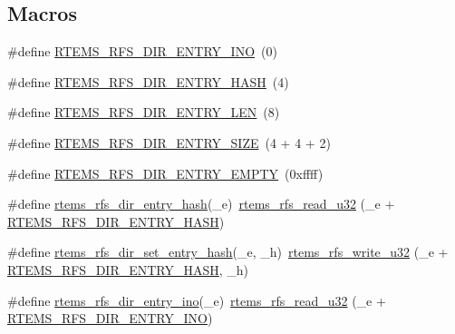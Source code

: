 \subsection*{Macros}
\begin{DoxyCompactItemize}
\item 
\#define \mbox{\hyperlink{rtems-rfs-dir_8h_a0b52d37896f9be61b9946bc726aecd4d}{R\+T\+E\+M\+S\+\_\+\+R\+F\+S\+\_\+\+D\+I\+R\+\_\+\+E\+N\+T\+R\+Y\+\_\+\+I\+NO}}~(0)
\item 
\#define \mbox{\hyperlink{rtems-rfs-dir_8h_a63fb1e0d701229800ef9f1206d8ac295}{R\+T\+E\+M\+S\+\_\+\+R\+F\+S\+\_\+\+D\+I\+R\+\_\+\+E\+N\+T\+R\+Y\+\_\+\+H\+A\+SH}}~(4)
\item 
\#define \mbox{\hyperlink{rtems-rfs-dir_8h_ab32ed76f1463d9de333a986fd2290f8f}{R\+T\+E\+M\+S\+\_\+\+R\+F\+S\+\_\+\+D\+I\+R\+\_\+\+E\+N\+T\+R\+Y\+\_\+\+L\+EN}}~(8)
\item 
\#define \mbox{\hyperlink{rtems-rfs-dir_8h_a57764521961897da4d101db20a52b054}{R\+T\+E\+M\+S\+\_\+\+R\+F\+S\+\_\+\+D\+I\+R\+\_\+\+E\+N\+T\+R\+Y\+\_\+\+S\+I\+ZE}}~(4 + 4 + 2)
\item 
\#define \mbox{\hyperlink{rtems-rfs-dir_8h_aa915855cc4cb98df4b2066beaa13030c}{R\+T\+E\+M\+S\+\_\+\+R\+F\+S\+\_\+\+D\+I\+R\+\_\+\+E\+N\+T\+R\+Y\+\_\+\+E\+M\+P\+TY}}~(0xffff)
\item 
\#define \mbox{\hyperlink{rtems-rfs-dir_8h_af5bfaf8b9997cd44ca60fd1e2347c73b}{rtems\+\_\+rfs\+\_\+dir\+\_\+entry\+\_\+hash}}(\+\_\+e)~\mbox{\hyperlink{rtems-rfs-data_8h_ae061f1784ebeef490293e0080740041a}{rtems\+\_\+rfs\+\_\+read\+\_\+u32}} (\+\_\+e + \mbox{\hyperlink{rtems-rfs-dir_8h_a63fb1e0d701229800ef9f1206d8ac295}{R\+T\+E\+M\+S\+\_\+\+R\+F\+S\+\_\+\+D\+I\+R\+\_\+\+E\+N\+T\+R\+Y\+\_\+\+H\+A\+SH}})
\item 
\#define \mbox{\hyperlink{rtems-rfs-dir_8h_a654eb125381a6880f1f2c681c762888c}{rtems\+\_\+rfs\+\_\+dir\+\_\+set\+\_\+entry\+\_\+hash}}(\+\_\+e,  \+\_\+h)~\mbox{\hyperlink{rtems-rfs-data_8h_a0e7b57b15dac03868caaeb7d2c8c1ba7}{rtems\+\_\+rfs\+\_\+write\+\_\+u32}} (\+\_\+e + \mbox{\hyperlink{rtems-rfs-dir_8h_a63fb1e0d701229800ef9f1206d8ac295}{R\+T\+E\+M\+S\+\_\+\+R\+F\+S\+\_\+\+D\+I\+R\+\_\+\+E\+N\+T\+R\+Y\+\_\+\+H\+A\+SH}}, \+\_\+h)
\item 
\#define \mbox{\hyperlink{rtems-rfs-dir_8h_a0de1a6950065a7f9d60e67991bebcd9e}{rtems\+\_\+rfs\+\_\+dir\+\_\+entry\+\_\+ino}}(\+\_\+e)~\mbox{\hyperlink{rtems-rfs-data_8h_ae061f1784ebeef490293e0080740041a}{rtems\+\_\+rfs\+\_\+read\+\_\+u32}} (\+\_\+e + \mbox{\hyperlink{rtems-rfs-dir_8h_a0b52d37896f9be61b9946bc726aecd4d}{R\+T\+E\+M\+S\+\_\+\+R\+F\+S\+\_\+\+D\+I\+R\+\_\+\+E\+N\+T\+R\+Y\+\_\+\+I\+NO}})

\end{DoxyCompactItemize}
